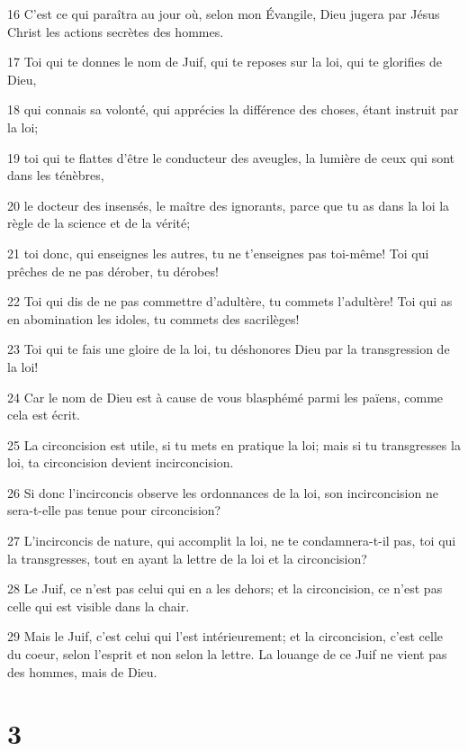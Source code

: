 \par 16 C'est ce qui paraîtra au jour où, selon mon Évangile, Dieu jugera par Jésus Christ les actions secrètes des hommes.
\par 17 Toi qui te donnes le nom de Juif, qui te reposes sur la loi, qui te glorifies de Dieu,
\par 18 qui connais sa volonté, qui apprécies la différence des choses, étant instruit par la loi;
\par 19 toi qui te flattes d'être le conducteur des aveugles, la lumière de ceux qui sont dans les ténèbres,
\par 20 le docteur des insensés, le maître des ignorants, parce que tu as dans la loi la règle de la science et de la vérité;
\par 21 toi donc, qui enseignes les autres, tu ne t'enseignes pas toi-même! Toi qui prêches de ne pas dérober, tu dérobes!
\par 22 Toi qui dis de ne pas commettre d'adultère, tu commets l'adultère! Toi qui as en abomination les idoles, tu commets des sacrilèges!
\par 23 Toi qui te fais une gloire de la loi, tu déshonores Dieu par la transgression de la loi!
\par 24 Car le nom de Dieu est à cause de vous blasphémé parmi les païens, comme cela est écrit.
\par 25 La circoncision est utile, si tu mets en pratique la loi; mais si tu transgresses la loi, ta circoncision devient incirconcision.
\par 26 Si donc l'incirconcis observe les ordonnances de la loi, son incirconcision ne sera-t-elle pas tenue pour circoncision?
\par 27 L'incirconcis de nature, qui accomplit la loi, ne te condamnera-t-il pas, toi qui la transgresses, tout en ayant la lettre de la loi et la circoncision?
\par 28 Le Juif, ce n'est pas celui qui en a les dehors; et la circoncision, ce n'est pas celle qui est visible dans la chair.
\par 29 Mais le Juif, c'est celui qui l'est intérieurement; et la circoncision, c'est celle du coeur, selon l'esprit et non selon la lettre. La louange de ce Juif ne vient pas des hommes, mais de Dieu.

\chapter{3}


